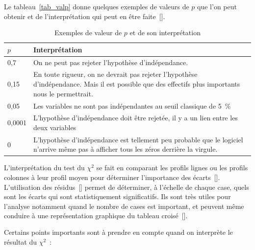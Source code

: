 \documentclass[a4paper,10pt,twoside,francais]{report}
\newcommand{\chid}{$\chi^2$\xspace}
\begin{document}
Le tableau~\vref{tab_valp} donne quelques exemples
de valeurs de $p$ que l'on peut obtenir et de l'interprétation qui
peut en être faite~[\pageref{ssec-valp}].

\begin{table}
  \begin{center}
    \begin{tabular}{lp{10cm}}
      \toprule
      $p$ & \textbf{Interprétation} \\
      \midrule
      0,7 & On ne peut pas rejeter l'hypothèse d'indépendance.\\
      0,15 & En toute rigueur, on ne devrait pas rejeter l'hypothèse
      d'indépendance. Mais il est possible que des effectifs plus
      importants nous le permettrait.\\
      0,05 & Les variables ne sont pas indépendantes au seuil classique de 5~\% \\
      0,0001 & L'hypothèse d'indépendance doit être rejetée, il y a un
      lien entre les deux variables \\
      0 & L'hypothèse d'indépendance est tellement peu probable que le
      logiciel n'arrive même pas à afficher tous les zéros derrière la
      virgule. \\
      \bottomrule
    \end{tabular}
    \caption{Exemples de valeur de $p$ et de son interprétation}
    \label{tab_valp}
  \end{center}
\end{table}

L'interprétation du test du \chid se fait en comparant les profils
lignes ou les profils colonnes à leur profil moyen pour déterminer
l'importance des écarts~[\pageref{ssec-sym}]. L'utilisation des
résidus~[\pageref{sec-residus}] permet de déterminer, à l'échelle de
chaque case, quels sont les écarts qui sont statistiquement
significatifs. Ils sont très utiles pour l'analyse notamment quand le
nombre de cases est important, et peuvent même conduire à une
représentation graphique du tableau croisé~[\pageref{fig_mosaic}].

Certains points importants sont à prendre en compte quand on
interprète le résultat du \chid~:
\end{document}
